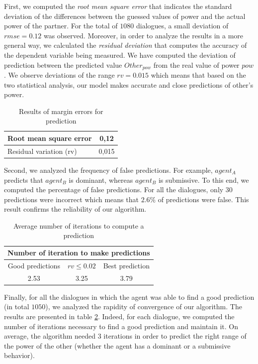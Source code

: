 \documentclass[conference, letterpaper]{IEEEtran}
\begin{document}
	First, we computed the \emph{root mean square error} that indicates the standard deviation of the differences between the guessed  values of power and the actual power of the partner. For the total of $1080$ dialogues, a small deviation of $rmse= 0.12$ was observed. Moreover, in order to analyze the results in a more general way, we calculated the \emph{residual deviation}  that computes the accuracy of the dependent variable being measured. We have computed the deviation of prediction between the predicted value  $Other_{pow}$ from the real value of power $pow$. 
	We observe deviations of the range $rv = 0.015$ which means that based on the two statistical analysis, our model makes accurate and close predictions of other's power.
	
	
	\begin{table}[h]
		\centering
		\large
		\caption{Results of margin errors for prediction} 
		\begin{tabular}{|l|c|}
			\hline
			Root mean square error & 0,12 \\
			\hline
			Residual variation (rv) & 0,015 \\
			\hline
		\end{tabular}
		
		\label{tab:res1}
	\end{table}
	
	Second, we analyzed the frequency of false predictions. For example, $agent_A$ predicts that $agent_B$ is dominant, whereas $agent_B$ is submissive. To this end, we computed the percentage of false predictions. For all the dialogues, only $30$ predictions were incorrect which means that $ 2.6 \% $ of predictions were false. This result confirms the reliability of our algorithm. 
	\begin{table}[h]
		\centering
		\large
		\caption{Average number of iterations to compute a prediction} 
		\begin{tabular}{|c|c|c|}
			\hline
			\multicolumn{3}{|c|}{Number of iteration to make predictions} \\
			\hline
			Good predictions & $rv \leq 0.02$ & Best prediction \\
			\hline
			2.53 & 3.25 & 3.79\\
			\hline
		\end{tabular}

		\label{tab:conv}
	\end{table}
	Finally, for all the dialogues in which the agent was able to find a good prediction (in total $1050$), we analyzed the rapidity of convergence of our algorithm. The results are presented in table \ref{tab:conv}. Indeed, for each dialogue, we computed the number of iterations necessary to find a good prediction and maintain it. On average, the algorithm needed $3$ iterations in order to predict the right range of the power of the other (whether the agent has a dominant or a submissive behavior). 
	
\end{document}
